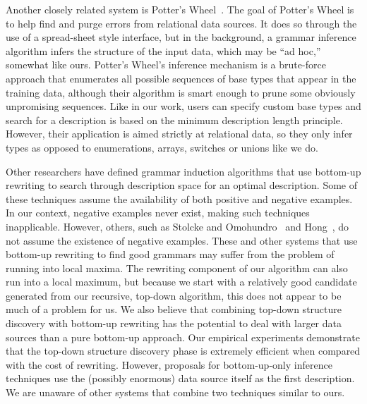 Another closely related system is Potter's Wheel~\cite{raman+:potterwheel}.
The goal of Potter's Wheel is to help find and purge errors from
relational data sources.  It does so through the use of a spread-sheet
style interface, but in the background, a grammar inference algorithm
infers the structure of the input data, which may be ``ad hoc,'' 
somewhat like ours.  Potter's Wheel's inference mechanism is a brute-force
approach that enumerates all possible sequences of base types that appear
in the training data, although their algorithm is smart enough to
prune some obviously unpromising sequences.  Like in our work,
users can specify custom base types and search for a description
is based on the minimum description length principle.  However,
their application is aimed
strictly at relational data, so they only infer  types
as opposed to enumerations, arrays, switches or unions like we do.  

Other researchers have defined grammar induction algorithms that use
bottom-up rewriting to search through description space for an optimal
description.  Some of these techniques assume the availability of both
positive and negative examples.  In our context, negative examples
never exist, making such techniques inapplicable.
However, others, such as Stolcke and
Omohundro~\cite{stolcke94inducing} and Hong~\cite{hong01using},
 do not assume the existence of negative examples.  These and other
systems that use bottom-up rewriting to find good grammars may
suffer from the problem of running into local maxima.  The rewriting component
of our algorithm can also run into a local maximum, but because we
start with a relatively good candidate generated from our recursive,
top-down algorithm, this does not appear to be much of a problem for us.
We also believe that combining top-down structure discovery with 
bottom-up rewriting has the potential to deal with larger
data sources than a pure bottom-up approach.  Our 
empirical experiments demonstrate that
the top-down structure discovery phase is extremely efficient when compared 
with the cost of rewriting.  However, proposals for bottom-up-only
inference techniques use the (possibly enormous) 
data source itself as the first 
description.  We are unaware of other systems that combine two
techniques similar to ours.

